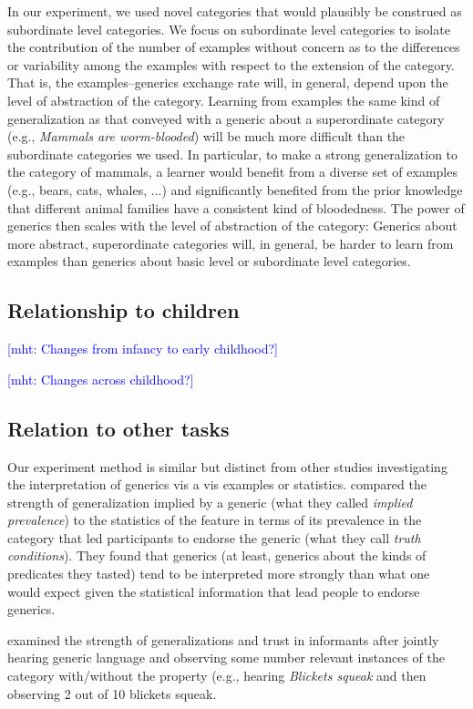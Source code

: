 \documentclass[10pt,letterpaper]{article}
\newcommand{\mht}[1]{\textcolor{Blue}{[mht: #1]}}
\begin{document}
In our experiment, we used novel categories that would plausibly be construed as subordinate level categories.
We focus on subordinate level categories to isolate the contribution of the number of examples without concern as to the differences or variability among the examples with respect to the extension of the category.
That is, the examples--generics exchange rate will, in general, depend upon the level of abstraction of the category. 
Learning from examples the same kind of generalization as that conveyed with a generic about a superordinate category (e.g., \emph{Mammals are worm-blooded}) will be much more difficult than the subordinate categories we used. 
In particular, to make a strong generalization to the category of mammals, a learner would benefit from a diverse set of examples (e.g., bears, cats, whales, ...) and significantly benefited from the prior knowledge that different animal families have a consistent kind of bloodedness. 
The power of generics then scales with the level of abstraction of the category: Generics about more abstract, superordinate categories will, in general, be harder to learn from examples than generics about basic level or subordinate level categories. 

\subsection{Relationship to children}

\mht{Changes from infancy to early childhood?}

\mht{Changes across childhood?}

\subsection{Relation to other tasks}

Our experiment method is similar but distinct from other studies investigating the interpretation of generics vis a vis examples or statistics.
 compared the strength of generalization implied by a generic (what they called \emph{implied prevalence}) to the statistics of the feature in terms of its prevalence in the category that led participants to endorse the generic (what they call \emph{truth conditions}). They found that generics (at least, generics about the kinds of predicates they tasted) tend to be interpreted more strongly than what one would expect given the statistical information that lead people to endorse generics. 

 examined the strength of generalizations and trust in informants after jointly hearing generic language and observing some number relevant instances of the category with/without the property (e.g., hearing \emph{Blickets squeak} and then observing 2 out of 10 blickets squeak.
\end{document}
